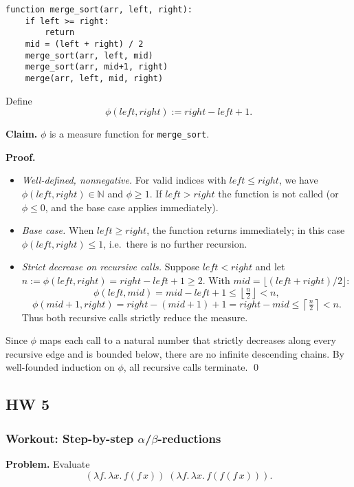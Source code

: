 \documentclass{article}
\theoremstyle{theorem}
\theoremstyle{definition}
\theoremstyle{remark}
\begin{document}
\begin{verbatim}
function merge_sort(arr, left, right):
    if left >= right:
        return
    mid = (left + right) / 2
    merge_sort(arr, left, mid)
    merge_sort(arr, mid+1, right)
    merge(arr, left, mid, right)
\end{verbatim}

Define
\[
\phi(left,right) := right - left + 1.
\]

\textbf{Claim.} $\phi$ is a measure function for \texttt{merge\_sort}.

\textbf{Proof.}
\begin{itemize}
    \item \emph{Well-defined, nonnegative.} For valid indices with $left \leq right$, we have $\phi(left,right) \in \mathbb{N}$ and $\phi \geq 1$. If $left > right$ the function is not called (or $\phi \leq 0$, and the base case applies immediately).
    \item \emph{Base case.} When $left \geq right$, the function returns immediately; in this case $\phi(left,right) \leq 1$, i.e.\ there is no further recursion.
    \item \emph{Strict decrease on recursive calls.} Suppose $left < right$ and let $n := \phi(left,right) = right-left+1 \geq 2$. With $mid = \lfloor (left+right)/2 \rfloor$:
    \[
    \phi(left,mid) = mid - left + 1 \leq \left\lfloor \tfrac{n}{2} \right\rfloor < n,
    \]
    \[
    \phi(mid+1,right) = right - (mid+1) + 1 = right - mid \leq \left\lceil \tfrac{n}{2} \right\rceil < n.
    \]
    Thus both recursive calls strictly reduce the measure.
\end{itemize}

Since $\phi$ maps each call to a natural number that strictly decreases along every recursive edge and is bounded below, there are no infinite descending chains. By well-founded induction on $\phi$, all recursive calls terminate. \qed

\subsection{HW 5}

\subsubsection{Workout: Step-by-step $\alpha$/$\beta$-reductions}

\noindent\textbf{Problem.} Evaluate
\[
(\lambda f.\,\lambda x.\,f(f\,x))\;(\lambda f.\,\lambda x.\,f(f(f\,x))).
\]
\end{document}
